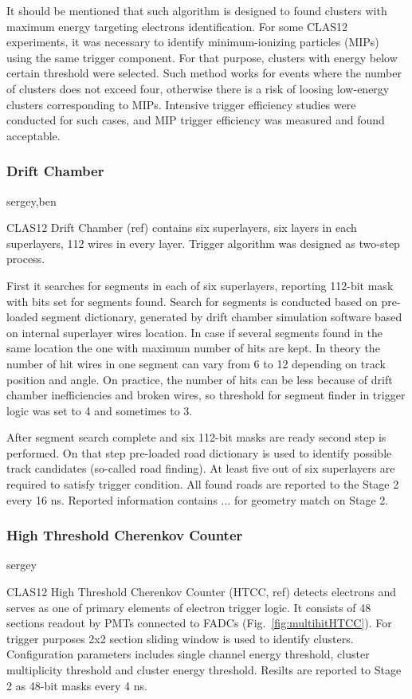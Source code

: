 It should be mentioned that such algorithm is designed to found clusters with maximum energy targeting electrons identification. For some CLAS12 experiments, it was necessary to identify minimum-ionizing particles (MIPs) using the same trigger component. For that purpose, clusters with energy below certain threshold were selected. Such method works for events where the number of clusters does not exceed four, otherwise there is a risk of loosing low-energy clusters corresponding to MIPs. Intensive trigger efficiency studies were conducted for such cases, and MIP trigger efficiency was measured and found acceptable.


\subsubsection{Drift Chamber} sergey,ben

CLAS12 Drift Chamber (ref) contains six superlayers, six layers in each superlayers, 112 wires in every layer. Trigger algorithm was designed as two-step process.

First it searches for segments in each of six superlayers, reporting 112-bit mask with bits set for segments found. Search for segments is conducted based on pre-loaded segment dictionary, generated by drift chamber simulation software based on internal superlayer wires location. In case if several segments found in the same location the one with maximum number of hits are kept. In theory the number of hit wires in one segment can vary from 6 to 12 depending on track position and angle. On practice, the number of hits can be less because of drift chamber inefficiencies and broken wires, so threshold for segment finder in trigger logic was set to 4 and sometimes to 3.

After segment search complete and six 112-bit masks are ready second step is performed. On that step pre-loaded road dictionary is used to identify possible track candidates (so-called road finding). At least five out of six superlayers are required to satisfy trigger condition. All found roads are reported to the Stage 2 every 16 ns. Reported information contains ... for geometry match on Stage 2.



\subsubsection{High Threshold Cherenkov Counter} sergey

CLAS12 High Threshold Cherenkov Counter (HTCC, ref) detects electrons and serves as one of primary elements of electron trigger logic. It consists of 48 sections readout by PMTs connected to FADCs (Fig.~\ref{fig:multihitHTCC}). For trigger purposes 2x2 section sliding window is used to identify clusters. Configuration parameters includes single channel energy threshold, cluster multiplicity threshold and cluster energy threshold. Resilts are reported to Stage 2 as 48-bit masks every 4 ns.


